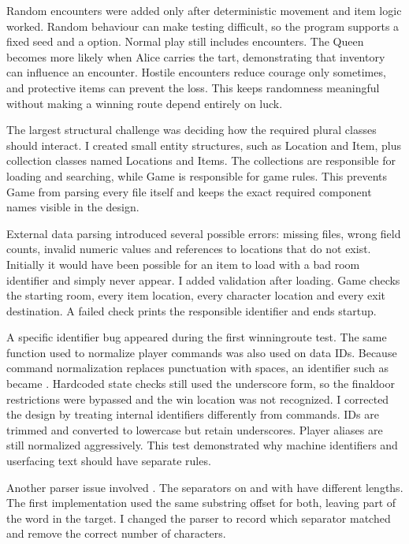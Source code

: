 \documentclass[letterpaper,10pt,english]{sphinxmanual}
\begin{document}
\sphinxAtStartPar
Random encounters were added only after deterministic movement and item logic
worked. Random behaviour can make testing difficult, so the program supports a
fixed seed and a  option. Normal play still includes encounters.
The Queen becomes more likely when Alice carries the tart, demonstrating that
inventory can influence an encounter. Hostile encounters reduce courage only
sometimes, and protective items can prevent the loss. This keeps randomness
meaningful without making a winning route depend entirely on luck.

\sphinxAtStartPar
The largest structural challenge was deciding how the required plural classes
should interact. I created small entity structures, such as Location and Item,
plus collection classes named Locations and Items. The collections are
responsible for loading and searching, while Game is responsible for game
rules. This prevents Game from parsing every file itself and keeps the exact
required component names visible in the design.

\sphinxAtStartPar
External data parsing introduced several possible errors: missing files, wrong
field counts, invalid numeric values and references to locations that do not
exist. Initially it would have been possible for an item to load with a bad
room identifier and simply never appear. I added validation after loading. Game
checks the starting room, every item location, every character location and
every exit destination. A failed check prints the responsible identifier and
ends startup.

\sphinxAtStartPar
A specific identifier bug appeared during the first winning\sphinxhyphen{}route test. The
same function used to normalize player commands was also used on data IDs.
Because command normalization replaces punctuation with spaces, an identifier
such as  became . Hard\sphinxhyphen{}coded state checks still
used the underscore form, so the final\sphinxhyphen{}door restrictions were bypassed and the
win location was not recognized. I corrected the design by treating internal
identifiers differently from commands. IDs are trimmed and converted to
lowercase but retain underscores. Player aliases are still normalized
aggressively. This test demonstrated why machine identifiers and user\sphinxhyphen{}facing
text should have separate rules.

\sphinxAtStartPar
Another parser issue involved . The separators
\textasciigrave{}\textasciigrave{} on \textasciigrave{}\textasciigrave{} and \textasciigrave{}\textasciigrave{} with \textasciigrave{}\textasciigrave{} have different lengths. The first implementation used
the same substring offset for both, leaving part of the word  in the
target. I changed the parser to record which separator matched and remove the
correct number of characters.
\end{document}
